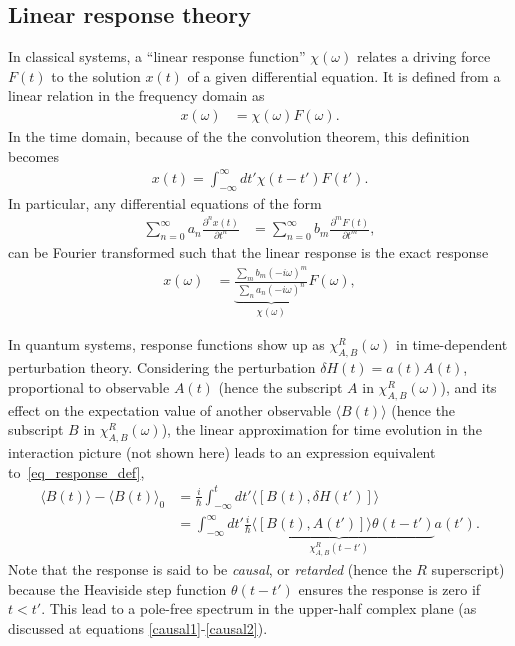 \documentclass[notitlepage,11pt,nofootinbib]{revtex4-1}
\begin{document}
\subsection{Linear response theory}
In classical systems, a ``linear response function'' $\chi(\omega)$ relates a driving force $F(t)$ to the solution $x(t)$ of a given differential equation. It is defined from a linear relation in the frequency domain as
\begin{align}
x(\omega)
&= \chi(\omega) F(\omega).
\label{eq_response_freq_def}
\end{align}
In the time domain, because of the the convolution theorem, this definition becomes
\begin{align} 
x(t) = \int_{-\infty}^{\infty}dt' \chi(t-t') F(t').
\label{eq_response_def}
\end{align}
In particular, any differential equations of the form
\begin{align}
\sum_{n=0}^{\infty} a_n \frac{\partial^n x(t)}{\partial t^n}
&= 
\sum_{n=0}^{\infty} b_m \frac{\partial^m F(t)}{\partial t^m},
\end{align}
can be Fourier transformed such that the linear response is the exact response
\begin{align}
x(\omega) &= \underbrace{\frac{\sum_{m} b_m (-i\omega)^m}{\sum_{n} a_n (-i\omega)^n}}_{\chi(\omega)} F(\omega),
\end{align}

In quantum systems, response functions show up as $\chi^{R}_{A,B}(\omega)$ in time-dependent perturbation theory. Considering the perturbation $\delta H(t) = a(t) A(t)$, proportional to observable $A(t)$ (hence the subscript $A$ in $\chi^{R}_{A,B}(\omega)$), and its effect on the expectation value of another observable $\langle B(t) \rangle$ (hence the subscript $B$ in $\chi^{R}_{A,B}(\omega)$), the linear approximation for time evolution in the interaction picture (not shown here) leads to an expression equivalent to~\eqref{eq_response_def},
\begin{align}
    \langle B(t) \rangle - \langle B(t) \rangle_0 
    &=
    \frac{i}{\hbar} 
    \int_{-\infty}^{t} dt'
    \langle [B(t), \delta H(t')] \rangle
    \\&=
    \int_{-\infty}^{\infty}dt'
    \underbrace{ 
    \frac{i}{\hbar} 
    \langle [B(t), A(t')] \rangle 
    \theta(t-t')
    }_{\chi^{R}_{A,B}(t-t')}
    a(t').
\end{align}
Note that the response is said to be \emph{causal}, or \emph{retarded} (hence the $R$ superscript) because the Heaviside step function $\theta(t-t')$ ensures the response is zero if $t<t'$. This lead to a pole-free spectrum in the upper-half complex plane (as discussed at equations \eqref{causal1}-\eqref{causal2}).
\end{document}

